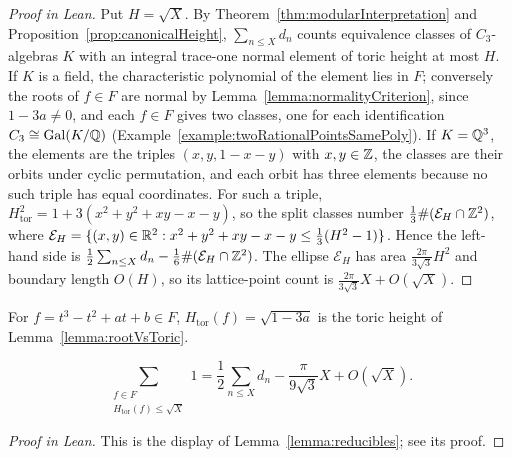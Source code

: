 \begin{proof}[Proof in Lean]

\leanok


Put $H=\sqrt X$. By Theorem~\ref{thm:modularInterpretation} and Proposition~\ref{prop:canonicalHeight}, $\sum_{n\leq X}d_n$ counts equivalence classes of $C_3$-algebras $K$ with an integral trace-one normal element of toric height at most $H$. If $K$ is a field, the characteristic polynomial of the element lies in $F$; conversely the roots of $f\in F$ are normal by Lemma~\ref{lemma:normalityCriterion}, since $1-3a\neq0$, and each $f\in F$ gives two classes, one for each identification $C_3\cong\operatorname{Gal}(K/\mathbb{Q})$ (Example~\ref{example:twoRationalPointsSamePoly}). If $K=\mathbb{Q}^3$, the elements are the triples $(x,y,1-x-y)$ with $x,y\in\mathbb{Z}$, the classes are their orbits under cyclic permutation, and each orbit has three elements because no such triple has equal coordinates. For such a triple, $H_{\mathrm{tor}}^2=1+3(x^2+y^2+xy-x-y)$, so the split classes number $\frac13\#(\mathcal E_H\cap\mathbb{Z}^2)$, where $\mathcal E_H=\{(x,y)\in\mathbb{R}^2:x^2+y^2+xy-x-y\leq\frac13(H^2-1)\}$. Hence the left-hand side is $\frac12\sum_{n\leq X}d_n-\frac16\#(\mathcal E_H\cap\mathbb{Z}^2)$. The ellipse $\mathcal E_H$ has area $\frac{2\pi}{3\sqrt3}H^2$ and boundary length $O(H)$, so its lattice-point count is $\frac{2\pi}{3\sqrt3}X+O(\sqrt X)$.

\end{proof}

\begin{equationnode}

\label{eqn:weightedPolynomialCount}


\leanok

For $f=t^3-t^2+at+b\in F$, $H_{\mathrm{tor}}(f)=\sqrt{1-3a}$ is the toric height of Lemma~\ref{lemma:rootVsToric}.

\begin{equation*} \sum_{\substack{f\in F\\H_{\mathrm{tor}}(f)\leq\sqrt X}}1 =\frac12\sum_{n\leq X}d_n -\frac{\pi}{9\sqrt3}X+O(\sqrt X). \end{equation*}

\end{equationnode}

\begin{proof}[Proof in Lean]

\leanok


This is the display of Lemma~\ref{lemma:reducibles}; see its proof.

\end{proof}

